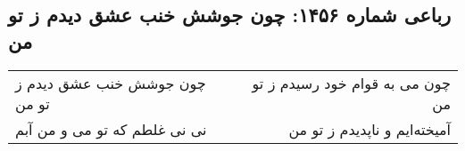 \begin{center}
\section*{رباعی شماره ۱۴۵۶: چون جوشش خنب عشق دیدم ز تو من}
\label{sec:1456}
\begin{longtable}{l p{0.5cm} r}
چون جوشش خنب عشق دیدم ز تو من
&&
چون می به قوام خود رسیدم ز تو من
\\
نی نی غلطم که تو می و من آبم
&&
آمیخته‌ایم و ناپدیدم ز تو من
\\
\end{longtable}
\end{center}

